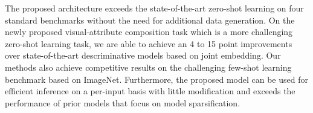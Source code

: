 \documentclass[10pt,twocolumn,letterpaper]{article}
\newcommand{\xin}[1]{\textcolor{red}{[Xin: #1]}}
\newcommand{\modelplural}{TAFE-Nets\xspace}
\begin{document}

The proposed architecture exceeds the state-of-the-art zero-shot learning on four standard benchmarks without the need for additional data generation. On the newly proposed visual-attribute composition task which is a more challenging zero-shot learning task, 
we are able to achieve an 4 to 15 point improvements over state-of-the-art descriminative models based on joint embedding. Our methods also achieve competitive results on the challenging few-shot learning benchmark based on ImageNet. Furthermore, the proposed model can be used for efficient inference
on a per-input basis with little modification 
and exceeds the performance of prior models that focus on model sparsification. 
\end{document}
